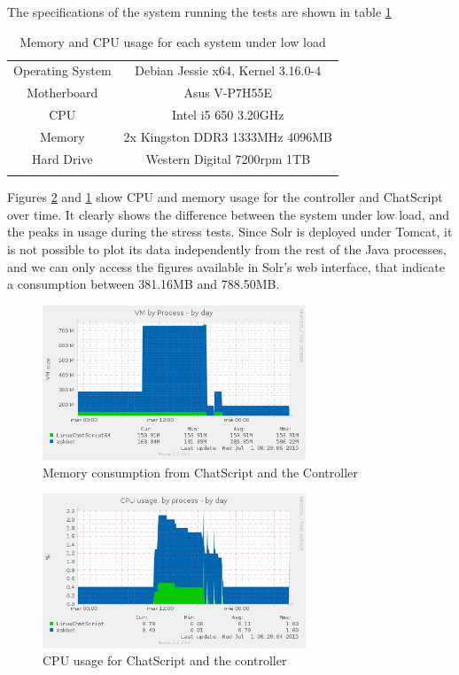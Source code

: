 The specifications of the system running the tests are shown in table \ref{tab:systeminfo}

\begin{table}
  \centering
  \begin{tabular*}{0.7\textwidth}{| c | c |}
    \hhline{|-|-|}
    Operating System & Debian Jessie x64, Kernel 3.16.0-4 \\ \hhline{|-|-|} 
    Motherboard & Asus V-P7H55E \\ \hhline{|-|-|} 
    CPU & Intel i5 650 3.20GHz  \\ \hhline{|-|-|} 
    Memory & 2x Kingston DDR3 1333MHz 4096MB  \\ \hhline{|-|-|} 
    Hard Drive & Western Digital 7200rpm 1TB \\ \hhline{|-|-|} 
    \end{tabular*}
  \caption{Memory and CPU usage for each system under low load}
  \label{tab:systeminfo}
\end{table}


Figures \ref{fig:cpuuse} and \ref{fig:memuse} show CPU and memory usage for the controller and ChatScript over time. It clearly shows the difference between the system under low load, and the peaks in usage during the stress tests. Since Solr is deployed under Tomcat, it is not possible to plot its data independently from the rest of the Java processes, and we can only access the figures available in Solr's web interface, that indicate a consumption between 381.16MB and 788.50MB.

\begin{figure}[!htbp]
    \centering
    \includegraphics[width=0.7\textwidth]{img/test/memory_by_process.png}
    \caption{Memory consumption from ChatScript and the Controller}
    \label{fig:memuse}
\end{figure}

\begin{figure}[!htbp]
    \centering
    \includegraphics[width=0.7\textwidth]{img/test/cpu_usage.png}
    \caption{CPU usage for ChatScript and the controller}
    \label{fig:cpuuse}
\end{figure}

